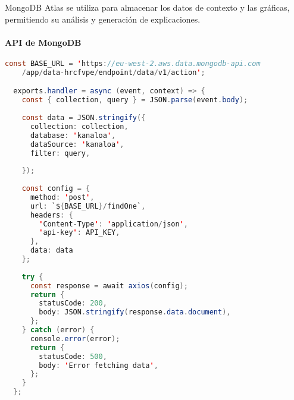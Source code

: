 MongoDB Atlas se utiliza para almacenar los datos de contexto y las gráficas, permitiendo su análisis y generación de explicaciones.

\paragraph{API de MongoDB}

\begin{lstlisting}[language=Java]
  const BASE_URL = 'https://eu-west-2.aws.data.mongodb-api.com
    /app/data-hrcfvpe/endpoint/data/v1/action';

  exports.handler = async (event, context) => {
    const { collection, query } = JSON.parse(event.body);
  
    const data = JSON.stringify({
      collection: collection,
      database: 'kanaloa',
      dataSource: 'kanaloa',
      filter: query,
    
    });
  
    const config = {
      method: 'post',
      url: `${BASE_URL}/findOne`,
      headers: {
        'Content-Type': 'application/json',
        'api-key': API_KEY,
      },
      data: data
    };
  
    try {
      const response = await axios(config);
      return {
        statusCode: 200,
        body: JSON.stringify(response.data.document),
      };
    } catch (error) {
      console.error(error);
      return {
        statusCode: 500,
        body: 'Error fetching data',
      };
    }
  };
\end{lstlisting}
